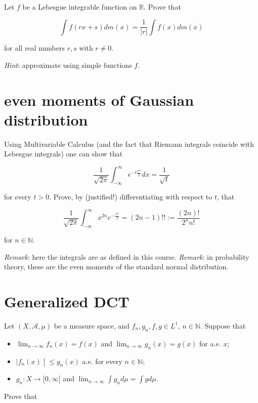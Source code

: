 \documentclass{qlnotes-export}
\begin{document}
Let \(f\) be a Lebesgue integrable function on \(\mathbb{R}\). Prove that

\[\int f(rx + s) dm(x) = \frac{1}{|r|}\int f(x) dm(x)\]

for all real numbers \(r,s\) with \(r \neq 0\).

\emph{Hint}: approximate using simple functions \(f\).

\section{even moments of Gaussian distribution}\label{even-moments-of-gaussian-distribution}

Using Multivariable Calculus (and the fact that Riemann integrals coincide with Lebesgue integrals) one can show that

\[\frac{1}{\sqrt{2\pi}}\int_{- \infty}^{\infty}e^{- t\frac{x^{2}}{2}} dx = \frac{1}{\sqrt{t}}\]

for every \(t > 0\). Prove, by (justified!) differentiating with respect to \(t\), that

\[\frac{1}{\sqrt{2\pi}}\int_{- \infty}^{\infty}x^{2n}e^{- \frac{x^{2}}{2}} = (2n - 1)!! := \frac{(2n)!}{2^{n}n!}\]

for \(n \in {\mathbb{N}}\).

\emph{Remark}: here the integrals are as defined in this course. \emph{Remark}: in probability theory, these are the even moments of the standard normal distribution.

\section{Generalized DCT}\label{generalized-dct}

Let \((X,\mathcal{A},\mu)\) be a measure space, and \(f_{n},g_{n},f,g \in L^{1}\), \(n \in {\mathbb{N}}\). Suppose that

\begin{itemize}
\item
  \(\lim_{n\rightarrow\infty}f_{n}(x) = f(x)\) and \(\lim_{n\rightarrow\infty}g_{n}(x) = g(x)\) for a.e. \(x\);
\item
  \(\left. |f_{n}(x) \middle| \leq g_{n}(x) \right.\) a.e. for every \(n \in {\mathbb{N}}\);
\item
  \(g_{n}:X\rightarrow\lbrack 0,\infty\rbrack\) and \(\lim_{n\rightarrow\infty}\int g_{n} d\mu = \int g d\mu\).
\end{itemize}

Prove that
\end{document}
